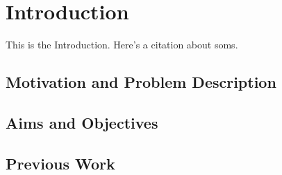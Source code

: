 
\section{Introduction}
\label{sec:introduction}
This is the Introduction. Here's a citation about \glspl{som}\citep{kohonen1990}.

\subsection{Motivation and Problem Description}
\label{subsec:motivation}

\subsection{Aims and Objectives}
\label{subsec:aims}

\subsection{Previous Work}
\label{subsec:previous_work}
